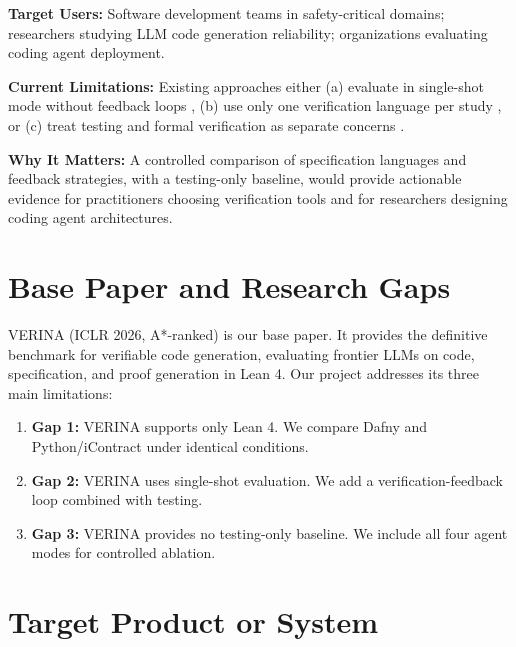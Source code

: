 \documentclass[11pt,a4paper]{article}
\begin{document}
\textbf{Target Users:} Software development teams in safety-critical domains; researchers studying LLM code generation reliability; organizations evaluating coding agent deployment.

\textbf{Current Limitations:} Existing approaches either (a) evaluate in single-shot mode without feedback loops \cite{verina2026, clever2025}, (b) use only one verification language per study \cite{alphaVerus2025, autoverus2025, dafnybench2025}, or (c) treat testing and formal verification as separate concerns \cite{togll2025, codeerrors2025}.

\textbf{Why It Matters:} A controlled comparison of specification languages and feedback strategies, with a testing-only baseline, would provide actionable evidence for practitioners choosing verification tools and for researchers designing coding agent architectures.

\section{Base Paper and Research Gaps}

VERINA \cite{verina2026} (ICLR 2026, A*-ranked) is our base paper. It provides the definitive benchmark for verifiable code generation, evaluating frontier LLMs on code, specification, and proof generation in Lean 4. Our project addresses its three main limitations:

\begin{enumerate}[noitemsep]
    \item \textbf{Gap 1:} VERINA supports only Lean 4. We compare Dafny and Python/iContract under identical conditions.
    \item \textbf{Gap 2:} VERINA uses single-shot evaluation. We add a verification-feedback loop combined with testing.
    \item \textbf{Gap 3:} VERINA provides no testing-only baseline. We include all four agent modes for controlled ablation.
\end{enumerate}

\section{Target Product or System}
\end{document}
